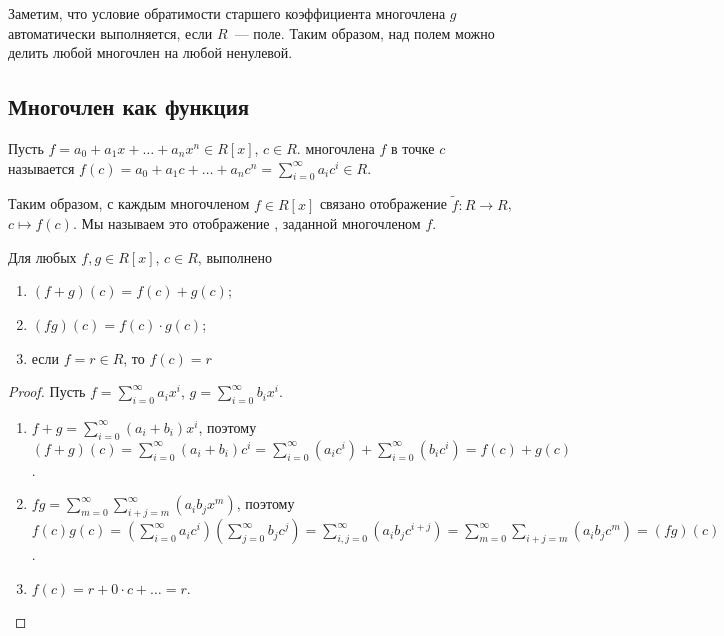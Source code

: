 \begin{remark}
Заметим, что условие обратимости старшего коэффициента многочлена $g$
автоматически выполняется, если $R$~--- поле. Таким образом,
над полем можно делить любой многочлен на любой ненулевой.
\end{remark}

\subsection{Многочлен как функция}


\begin{definition}\label{dfn:poly-value}
Пусть $f=a_0+a_1x+\dots+a_nx^n\in R[x]$,
$c\in R$. 
многочлена $f$ в точке $c$ называется
$f(c)=a_0+a_1c+\dots+a_nc^n=\sum_{i=0}^\infty a_ic^i\in R$.
\end{definition}

\begin{remark}\label{rem_poly_function}
Таким образом, с каждым многочленом $f\in R[x]$ связано отображение
$\widetilde{f}\colon R\to R$, $c\mapsto f(c)$.
Мы называем это отображение , заданной
многочленом $f$.
\end{remark}

\begin{proposition}\label{prop:evaluation-properties}
Для любых $f,g\in R[x]$, $c\in R$, выполнено
\begin{enumerate}
\item $(f+g)(c)=f(c)+g(c)$;
\item $(fg)(c)=f(c)\cdot g(c)$;
\item если $f=r\in R$, то $f(c)=r$
\end{enumerate}
\end{proposition}
\begin{proof}
Пусть $f=\sum_{i=0}^\infty a_ix^i$, $g=\sum_{i=0}^\infty
b_ix^i$.
\begin{enumerate}
\item $f+g=\sum_{i=0}^\infty (a_i+b_i)x^i$, поэтому
$(f+g)(c)=\sum_{i=0}^\infty
(a_i+b_i)c^i=\sum_{i=0}^\infty(a_ic^i)+\sum_{i=0}^\infty(b_ic^i)=f(c)+g(c)$.
\item $fg=\sum_{m=0}^\infty\sum_{i+j=m}^\infty (a_ib_jx^m)$, поэтому
$f(c)g(c)=(\sum_{i=0}^\infty a_ic^i)(\sum_{j=0}^\infty
b_jc^j)=\sum_{i,j=0}^\infty
(a_ib_jc^{i+j})=\sum_{m=0}^\infty\sum_{i+j=m}(a_ib_jc^{m})=(fg)(c)$.
\item $f(c)=r+0\cdot c+\dots=r$.
\end{enumerate}
\end{proof}

